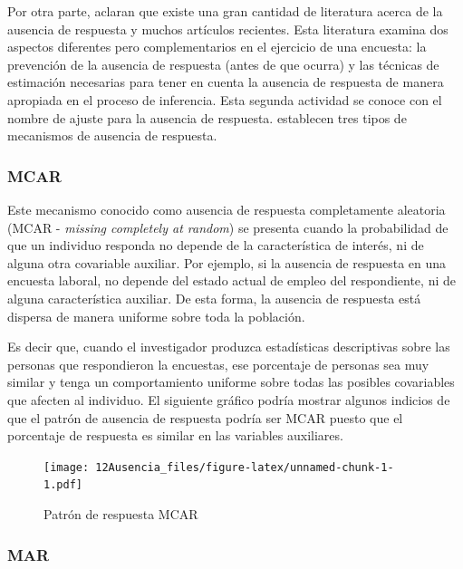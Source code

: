 \documentclass[
  10pt,
  spanish,
]{book}
\begin{document}
Por otra parte, \citet{Lund} aclaran que existe una gran cantidad de literatura acerca de la ausencia de respuesta y muchos artículos recientes. Esta literatura examina dos aspectos diferentes pero complementarios en el ejercicio de una encuesta: la prevención de la ausencia de respuesta (antes de que ocurra) y las técnicas de estimación necesarias para tener en cuenta la ausencia de respuesta de manera apropiada en el proceso de inferencia. Esta segunda actividad se conoce con el nombre de ajuste para la ausencia de respuesta. \citet{LR2002} establecen tres tipos de mecanismos de ausencia de respuesta.

\hypertarget{mcar}{%
\subsubsection*{MCAR}\label{mcar}}

Este mecanismo conocido como ausencia de respuesta completamente aleatoria (MCAR - \emph{missing completely at random}) se presenta cuando la probabilidad de que un individuo responda no depende de la característica de interés, ni de alguna otra covariable auxiliar. Por ejemplo, si la ausencia de respuesta en una encuesta laboral, no depende del estado actual de empleo del respondiente, ni de alguna característica auxiliar. De esta forma, la ausencia de respuesta está dispersa de manera uniforme sobre toda la población.

Es decir que, cuando el investigador produzca estadísticas descriptivas sobre las personas que respondieron la encuestas, ese porcentaje de personas sea muy similar y tenga un comportamiento uniforme sobre todas las posibles covariables que afecten al individuo. El siguiente gráfico podría mostrar algunos indicios de que el patrón de ausencia de respuesta podría ser MCAR puesto que el porcentaje de respuesta es similar en las variables auxiliares.

\begin{figure}
\centering
\texttt{[image: 12Ausencia\_files/figure-latex/unnamed-chunk-1-1.pdf]}
\caption{\label{fig:unnamed-chunk-1}Patrón de respuesta MCAR}
\end{figure}

\hypertarget{mar}{%
\subsubsection*{MAR}\label{mar}}
\end{document}
